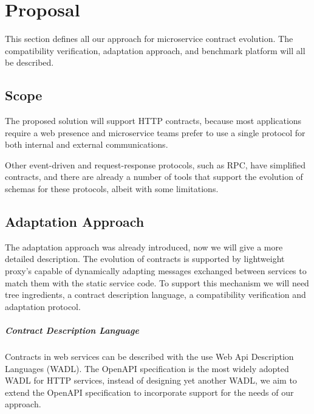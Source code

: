 
%

\chapter{Proposal}
\label{cha:proposal}

This section defines all our approach for microservice contract evolution.
The compatibility verification, adaptation approach, and benchmark platform will all be described.

\section{Scope} %
\label{sec:scope}

The proposed solution will support HTTP contracts, because
most applications require a web presence and
microservice teams prefer to use a single protocol for both internal and external communications.

Other event-driven and request-response protocols, such as RPC,
have simplified contracts, and there are already a number of tools that support the evolution of schemas for these protocols,
albeit with some limitations.

\section{Adaptation Approach} %
\label{sec:adaptation_approach}

The adaptation approach was already introduced, now we will give a more detailed description.
The evolution of contracts is supported by lightweight proxy's capable of dynamically adapting messages exchanged between services to match them with the static service code.
To support this mechanism we will need tree ingredients, a contract description language, a compatibility verification and adaptation protocol.

\paragraph{Contract Description Language}

Contracts in web services can be described with the use Web Api Description Languages (WADL).
The OpenAPI specification is the most widely adopted WADL for HTTP services, instead of designing yet another WADL,
we aim to extend the OpenAPI specification to incorporate support for the needs of our approach.

